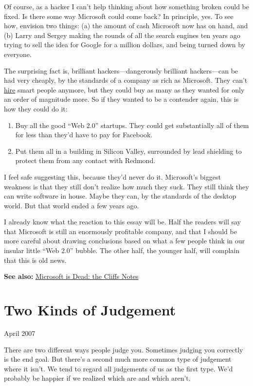 \documentclass[12pt]{book}
\begin{document}
Of course, as a hacker I can't help thinking about how something broken
could be fixed. Is there some way Microsoft could come back? In
principle, yes. To see how, envision two things: (a) the amount of cash
Microsoft now has on hand, and (b) Larry and Sergey making the rounds of
all the search engines ten years ago trying to sell the idea for Google
for a million dollars, and being turned down by everyone.

The surprising fact is, brilliant hackers---dangerously brilliant
hackers---can be had very cheaply, by the standards of a company as rich
as Microsoft. They can't \href{hiring.html}{hire} smart people anymore,
but they could buy as many as they wanted for only an order of magnitude
more. So if they wanted to be a contender again, this is how they could
do it:

\begin{enumerate}
\def\labelenumi{\arabic{enumi}.}
\item
  Buy all the good ``Web 2.0'' startups. They could get substantially
  all of them for less than they'd have to pay for Facebook.
\item
  Put them all in a building in Silicon Valley, surrounded by lead
  shielding to protect them from any contact with Redmond.
\end{enumerate}

I feel safe suggesting this, because they'd never do it. Microsoft's
biggest weakness is that they still don't realize how much they suck.
They still think they can write software in house. Maybe they can, by
the standards of the desktop world. But that world ended a few years
ago.

I already know what the reaction to this essay will be. Half the readers
will say that Microsoft is still an enormously profitable company, and
that I should be more careful about drawing conclusions based on what a
few people think in our insular little ``Web 2.0'' bubble. The other
half, the younger half, will complain that this is old news.

\textbf{See also:} \href{cliffsnotes.html}{Microsoft is Dead: the Cliffs
Notes}
\chapter{Two Kinds of Judgement}

April 2007

There are two different ways people judge you. Sometimes judging you
correctly is the end goal. But there's a second much more common type of
judgement where it isn't. We tend to regard all judgements of us as the
first type. We'd probably be happier if we realized which are and which
aren't.
\end{document}
